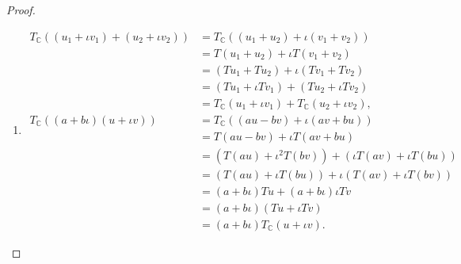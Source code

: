 \begin{proof}
    \begin{enumerate}[label={(\alph*)}]
        \item \begingroup\allowdisplaybreaks{}
              \begin{align*}
                  T_{\mathbb{C}}((u_{1} + \iota v_{1}) + (u_{2} + \iota v_{2})) & = T_{\mathbb{C}}((u_{1} + u_{2}) + \iota (v_{1} + v_{2}))                    \\
                                                                                & = T(u_{1} + u_{2}) + \iota T(v_{1} + v_{2})                                  \\
                                                                                & = (Tu_{1} + Tu_{2}) + \iota (Tv_{1} + Tv_{2})                                \\
                                                                                & = (Tu_{1} + \iota Tv_{1}) + (Tu_{2} + \iota Tv_{2})                          \\
                                                                                & = T_{\mathbb{C}}(u_{1} + \iota v_{1}) + T_{\mathbb{C}}(u_{2} + \iota v_{2}), \\
                  T_{\mathbb{C}}((a + b\iota)(u + \iota v))                     & = T_{\mathbb{C}}((au - bv) + \iota (av + bu))                                \\
                                                                                & = T(au - bv) + \iota T(av + bu)                                              \\
                                                                                & = (T(au) + \iota^{2} T(bv)) + (\iota T(av) + \iota T(bu))                    \\
                                                                                & = (T(au) + \iota T(bu)) + \iota (T(av) + \iota T(bv))                        \\
                                                                                & = (a + b\iota) Tu + (a + b\iota)\iota Tv                                     \\
                                                                                & = (a + b\iota) (Tu + \iota Tv)                                               \\
                                                                                & = (a + b\iota) T_{\mathbb{C}}(u + \iota v).
              \end{align*}
              \endgroup


\end{enumerate}
\end{proof}
